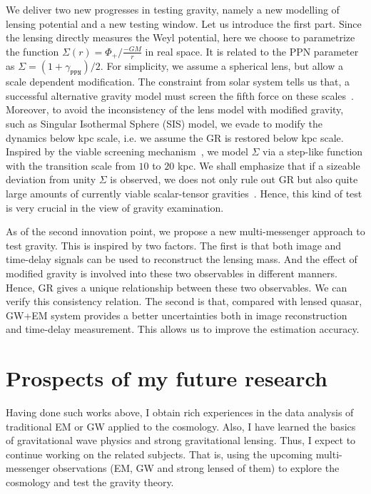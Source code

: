 \documentclass[11pt,letterpaper,sans]{moderncv}   %
\begin{document}
\vspace{2mm}
\noindent
We deliver two new progresses in testing gravity, namely a new modelling of lensing potential and a new testing window. Let us introduce the first part. Since the lensing directly measures the Weyl potential, here we choose to parametrize the function $\Sigma(r)=\Phi_+/\frac{-GM}{r}$ in real space.
It is related to the PPN parameter as $\Sigma=(1+\gamma_{\texttt{PPN}})/2$. For simplicity, we assume a spherical lens, but allow a scale dependent modification.
The constraint from solar system tells us that, a successful alternative gravity model must screen the fifth force on these
scales~\cite{Joyce:2014kja}. Moreover, to avoid the inconsistency of the lens model with modified gravity, such as Singular Isothermal Sphere (SIS) model, we evade to modify the dynamics below kpc scale, i.e. we assume the GR is restored below kpc scale.
Inspired by the viable screening mechanism~\cite{Joyce:2014kja}, we model
$\Sigma$ via a step-like function with the
transition scale from $10$ to $20$ kpc.
We shall emphasize that if a sizeable deviation from unity $\Sigma$ is observed, we does not only rule out GR but also quite large amounts of currently viable scalar-tensor gravities~\cite{Pogosian:2016pwr}.
Hence, this kind of test is very crucial in the view of gravity examination.

\vspace{2mm}
\noindent
As of the second innovation point, we propose a new multi-messenger approach to test gravity.
This is inspired by two factors.
The first is that both image and time-delay signals can be used to reconstruct the lensing mass.
And the  effect of modified gravity  is involved into these two observables in different manners.
Hence, GR gives a unique relationship between these two observables. We can verify this consistency relation.
The second is that, compared with lensed quasar, GW+EM system provides a better uncertainties both in image reconstruction and time-delay measurement.
This allows us to improve the estimation accuracy.





\vspace{5mm}

\section{\textcolor{color1}{\textbf{Prospects of my future research }}}

\vspace{2mm}
\noindent
Having done such works above, I obtain rich experiences in the data analysis of traditional EM or GW applied to the cosmology. Also, I have learned the basics of gravitational wave physics and strong gravitational lensing. Thus, I expect to continue working on the related subjects. That is, using the upcoming multi-messenger observations (EM, GW and strong lensed of them) to explore the cosmology and test the gravity theory.
\end{document}
